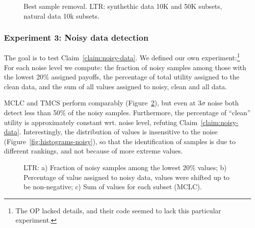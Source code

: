 \begin{figure}[h]
  \hspace*{-3mm}
  \caption{\label{fig:best-sample-removal}Best sample removal. LTR: synthethic
  data 10K and 50K subsets, natural data 10k subsets.}
\end{figure}

\subsubsection{Experiment 3: Noisy data
detection}\label{sec:result-noisy-data}

The goal is to test Claim~\ref{claim:noisy-data}. We defined our own
experiment:\footnote{The OP lacked details, and their code seemed to lack this
particular experiment.} For each noise level we compute: the fraction of noisy
samples among those with the lowest 20\% assigned payoffs, the percentage of
total utility assigned to the clean data, and the sum of all values assigned
to noisy, clean and all data.

MCLC and TMCS perform comparably (Figure~\ref{fig:noisy-detection}), but even
at $3 \sigma$ noise both detect less than 50\% of the noisy samples.
Furthermore, the percentage of ``clean'' utility is approximately constant
wrt. noise level, refuting Claim~\ref{claim:noisy-data}. Interestingly, the
distribution of values is insensitive to the noise
(Figure~\ref{fig:histograms-noisy}), so that the identification of samples is
due to different rankings, and not because of more extreme values.

\begin{figure}[h]
  \hspace*{-3mm}
  \caption{\label{fig:noisy-detection}LTR: a) Fraction of noisy samples among
  the lowest 20\% values; b) Percentage of value assigned to noisy data,
  values were shifted up to be non-negative; c) Sum of values for each subset
  (MCLC).}
\end{figure}

